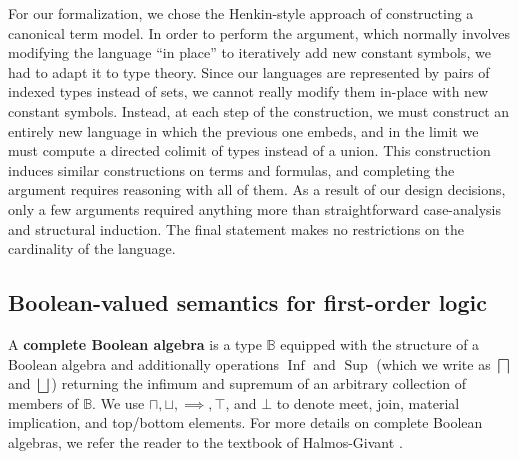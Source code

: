 \documentclass[a4paper,USenglish,cleveref, autoref]{lipics-v2019}
\newcommand{\B}{\mathbb{B}}
\theoremstyle{theorem}
\theoremstyle{definition}
\begin{document}
For our formalization, we chose the Henkin-style approach of constructing a canonical term model. In order to perform the argument, which normally involves modifying the language ``in place'' to iteratively add new constant symbols, we had to adapt it to type theory. Since our languages are represented by pairs of indexed types instead of sets, we cannot really modify them in-place with new constant symbols. Instead, at each step of the construction, we must construct an entirely new language in which the previous one embeds, and in the limit we must compute a directed colimit of types instead of a union. This construction induces similar constructions on terms and formulas, and completing the argument requires reasoning with all of them. As a result of our design decisions, only a few arguments required anything more than straightforward case-analysis and structural induction. The final statement makes no restrictions on the cardinality of the language.

\subsection{Boolean-valued semantics for first-order logic}

A \textbf{complete Boolean algebra} is a type $\B$ equipped with the structure of a Boolean algebra and additionally operations $\operatorname{Inf}$ and $\operatorname{Sup}$ (which we write as $\bigsqcap$ and $\bigsqcup$) returning the infimum and supremum of an arbitrary collection of members of $\B$. We use $\sqcap, \sqcup, \implies, \top$, and $\bot$ to denote meet, join, material implication, and top/bottom elements. For more details on complete Boolean algebras, we refer the reader to the textbook of Halmos-Givant \cite{givant2008introduction}.
\end{document}
